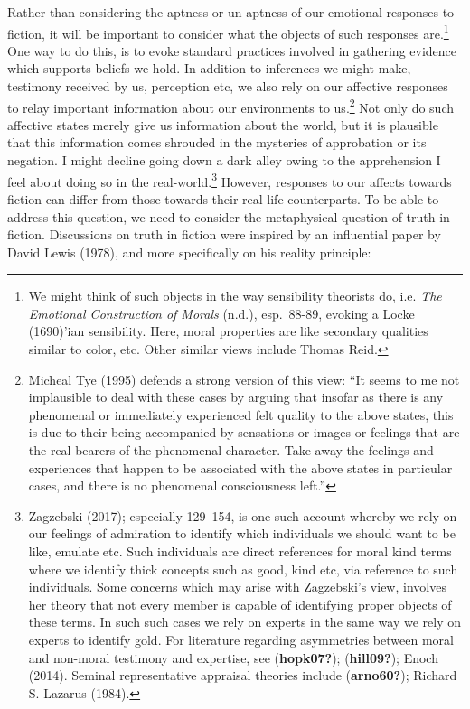 \documentclass[12pt]{book}
\theoremstyle{definition}
\theoremstyle{remark}
\begin{document}
Rather than considering the aptness or un-aptness of our emotional responses to fiction, it will be important to consider what the objects of such responses are.\footnote{We might think of such objects in the way sensibility theorists do, i.e. \emph{The {Emotional Construction} of {Morals}} (n.d.), esp.~88-89, evoking a Locke (1690)'ian sensibility. Here, moral properties are like secondary qualities similar to color, etc. Other similar views include Thomas Reid.} One way to do this, is to evoke standard practices involved in gathering evidence which supports beliefs we hold. In addition to inferences we might make, testimony received by us, perception etc, we also rely on our affective responses to relay important information about our environments to us.\footnote{Micheal Tye (1995) defends a strong version of this view: ``It seems to me not implausible to deal with these cases by arguing that insofar as there is any phenomenal or immediately experienced felt quality to the above states, this is due to their being accompanied by sensations or images or feelings that are the real bearers of the phenomenal character. Take away the feelings and experiences that happen to be associated with the above states in particular cases, and there is no phenomenal consciousness left.''} Not only do such affective states merely give us information about the world, but it is plausible that this information comes shrouded in the mysteries of approbation or its negation. I might decline going down a dark alley owing to the apprehension I feel about doing so in the real-world.\footnote{Zagzebski (2017); especially 129--154, is one such account whereby we rely on our feelings of admiration to identify which individuals we should want to be like, emulate etc. Such individuals are direct references for moral kind terms where we identify thick concepts such as good, kind etc, via reference to such individuals. Some concerns which may arise with Zagzebski's view, involves her theory that not every member is capable of identifying proper objects of these terms. In such such cases we rely on experts in the same way we rely on experts to identify gold. For literature regarding asymmetries between moral and non-moral testimony and expertise, see (\textbf{hopk07?}); (\textbf{hill09?}); Enoch (2014). Seminal representative appraisal theories include (\textbf{arno60?}); Richard S. Lazarus (1984).} However, responses to our affects towards fiction can differ from those towards their real-life counterparts. To be able to address this question, we need to consider the metaphysical question of truth in fiction. Discussions on truth in fiction were inspired by an influential paper by David Lewis (1978), and more specifically on his reality principle:
\end{document}
